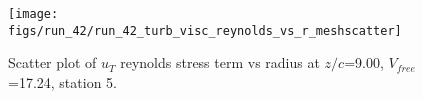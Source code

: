 \begin{figure}[H]
\centering
\texttt{[image: figs/run\_42/run\_42\_turb\_visc\_reynolds\_vs\_r\_meshscatter]}
\caption{Scatter plot of $
u_T$ reynolds stress term vs radius at $z/c$=9.00, $V_{free}$=17.24, station 5.}
\label{fig:run_42_turb_visc_reynolds_vs_r_meshscatter}
\end{figure}


